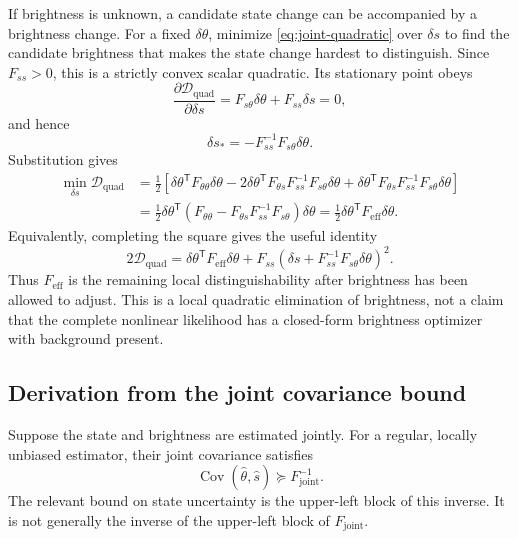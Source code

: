 \documentclass[11pt,a4paper]{article}
\begin{document}
If brightness is unknown, a candidate state change can be accompanied by
a brightness change. For a fixed $\delta\theta$, minimize
\eqref{eq:joint-quadratic} over $\delta s$ to find the candidate brightness
that makes the state change hardest to distinguish. Since $F_{ss}>0$,
this is a strictly convex scalar quadratic. Its stationary point obeys
\begin{equation}
 \frac{\partial\mathcal D_{\mathrm{quad}}}{\partial\delta s}
 =F_{s\theta}\delta\theta+F_{ss}\delta s=0,
\end{equation}
and hence
\begin{equation}
 \delta s_*=-F_{ss}^{-1}F_{s\theta}\delta\theta.
\end{equation}
Substitution gives
\begin{align}
 \min_{\delta s}\mathcal D_{\mathrm{quad}}
 &=\frac12\left[
 \delta\theta^{\mathsf T}F_{\theta\theta}\delta\theta
 -2\delta\theta^{\mathsf T}F_{\theta s}F_{ss}^{-1}
 F_{s\theta}\delta\theta
 +\delta\theta^{\mathsf T}F_{\theta s}F_{ss}^{-1}
 F_{s\theta}\delta\theta\right]\\
 &=\frac12\delta\theta^{\mathsf T}
 \left(F_{\theta\theta}-F_{\theta s}F_{ss}^{-1}F_{s\theta}\right)
 \delta\theta
 =\frac12\delta\theta^{\mathsf T}F_{\mathrm{eff}}\delta\theta.
\end{align}
Equivalently, completing the square gives the useful identity
\begin{equation}
 2\mathcal D_{\mathrm{quad}}
 =\delta\theta^{\mathsf T}F_{\mathrm{eff}}\delta\theta
 +F_{ss}\left(\delta s+
 F_{ss}^{-1}F_{s\theta}\delta\theta\right)^2.
\end{equation}
Thus $F_{\mathrm{eff}}$ is the remaining local distinguishability after
brightness has been allowed to adjust. This is a local quadratic
elimination of brightness, not a claim that the complete nonlinear
likelihood has a closed-form brightness optimizer with background present.

\subsection{Derivation from the joint covariance bound}
Suppose the state and brightness are estimated jointly. For a regular,
locally unbiased estimator, their joint covariance satisfies
\begin{equation}
 \operatorname{Cov}(\widehat\theta,\widehat s)
 \succeq F_{\mathrm{joint}}^{-1}.
\end{equation}
The relevant bound on state uncertainty is the upper-left block of this
inverse. It is not generally the inverse of the upper-left block of
$F_{\mathrm{joint}}$.
\end{document}
